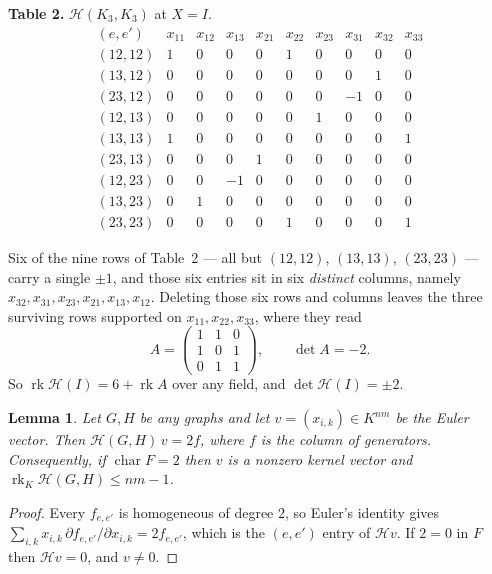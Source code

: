 \documentclass[11pt]{amsart}
\newtheorem{lemma}[theorem]{Lemma}
\theoremstyle{remark}
\DeclareMathOperator{\rk}{rk}
\newcommand{\Hm}{\mathcal H}
\begin{document}
\medskip
\noindent\textbf{Table 2.} $\Hm(K_3,K_3)$ at $X=I$.
{\small
\[
\begin{array}{r|rrrrrrrrr}
 (e,e') & x_{11} & x_{12} & x_{13} & x_{21} & x_{22} & x_{23}
        & x_{31} & x_{32} & x_{33}\\\hline
 (12,12) & 1 & 0 & 0 & 0 & 1 & 0 & 0 & 0 & 0\\
 (13,12) & 0 & 0 & 0 & 0 & 0 & 0 & 0 & 1 & 0\\
 (23,12) & 0 & 0 & 0 & 0 & 0 & 0 & -1 & 0 & 0\\
 (12,13) & 0 & 0 & 0 & 0 & 0 & 1 & 0 & 0 & 0\\
 (13,13) & 1 & 0 & 0 & 0 & 0 & 0 & 0 & 0 & 1\\
 (23,13) & 0 & 0 & 0 & 1 & 0 & 0 & 0 & 0 & 0\\
 (12,23) & 0 & 0 & -1 & 0 & 0 & 0 & 0 & 0 & 0\\
 (13,23) & 0 & 1 & 0 & 0 & 0 & 0 & 0 & 0 & 0\\
 (23,23) & 0 & 0 & 0 & 0 & 1 & 0 & 0 & 0 & 1
\end{array}
\]}

\medskip
Six of the nine rows of Table~2 --- all but $(12,12)$, $(13,13)$, $(23,23)$
--- carry a single $\pm1$, and those six entries sit in six \emph{distinct}
columns, namely $x_{32},x_{31},x_{23},x_{21},x_{13},x_{12}$. Deleting those
six rows and columns leaves the three surviving rows supported on
$x_{11},x_{22},x_{33}$, where they read
\begin{equation}\label{eq:A}
 A=\begin{pmatrix}1&1&0\\1&0&1\\0&1&1\end{pmatrix},
 \qquad \det A=-2 .
\end{equation}
So $\rk\Hm(I)=6+\rk A$ over any field, and $\det\Hm(I)=\pm2$.

\begin{lemma}\label{lem:euler}
Let $G,H$ be any graphs and let $v=(x_{i,k})\in K^{nm}$ be the Euler vector.
Then $\Hm(G,H)\,v=2f$, where $f$ is the column of generators. Consequently, if
$\operatorname{char}F=2$ then $v$ is a nonzero kernel vector and
$\rk_K\Hm(G,H)\le nm-1$.
\end{lemma}

\begin{proof}
Every $f_{e,e'}$ is homogeneous of degree $2$, so Euler's identity gives
$\sum_{i,k}x_{i,k}\,\partial f_{e,e'}/\partial x_{i,k}=2f_{e,e'}$, which is the
$(e,e')$ entry of $\Hm v$. If $2=0$ in $F$ then $\Hm v=0$, and $v\neq0$.
\end{proof}
\end{document}
